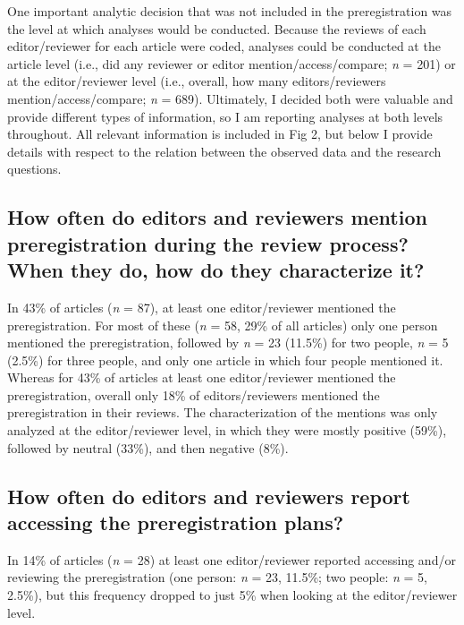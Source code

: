 \documentclass[authordate, meta]{jote-new-article}
\begin{document}
	One important analytic decision that was not included in the preregistration was the level at which analyses would be conducted. Because the reviews of each editor/reviewer for each article were coded, analyses could be conducted at the article level (i.e., did any reviewer or editor mention/access/compare; \emph{n} = 201) or at the editor/reviewer level (i.e., overall, how many editors/reviewers mention/access/compare; \emph{n} = 689). Ultimately, I decided both were valuable and provide different types of information, so I am reporting analyses at both levels throughout. All relevant information is included in Fig 2, but below I provide details with respect to the relation between the observed data and the research questions.



	\subsection{How often do editors and reviewers mention preregistration during the review process? When they do, how do they characterize it?}



	In 43\% of articles (\emph{n} = 87), at least one editor/reviewer mentioned the preregistration. For most of these (\emph{n} = 58, 29\% of all articles) only one person mentioned the preregistration, followed by \emph{n} = 23 (11.5\%) for two people, \emph{n} = 5 (2.5\%) for three people, and only one article in which four people mentioned it. Whereas for 43\% of articles at least one editor/reviewer mentioned the preregistration, overall only 18\% of editors/reviewers mentioned the preregistration in their reviews. The characterization of the mentions was only analyzed at the editor/reviewer level, in which they were mostly positive (59\%), followed by neutral (33\%), and then negative (8\%).

	

	\subsection{How often do editors and reviewers report accessing the preregistration plans?}



	In 14\% of articles (\emph{n} = 28) at least one editor/reviewer reported accessing and/or reviewing the preregistration (one person: \emph{n} = 23, 11.5\%; two people: \emph{n} = 5, 2.5\%), but this frequency dropped to just 5\% when looking at the editor/reviewer level.
\end{document}
